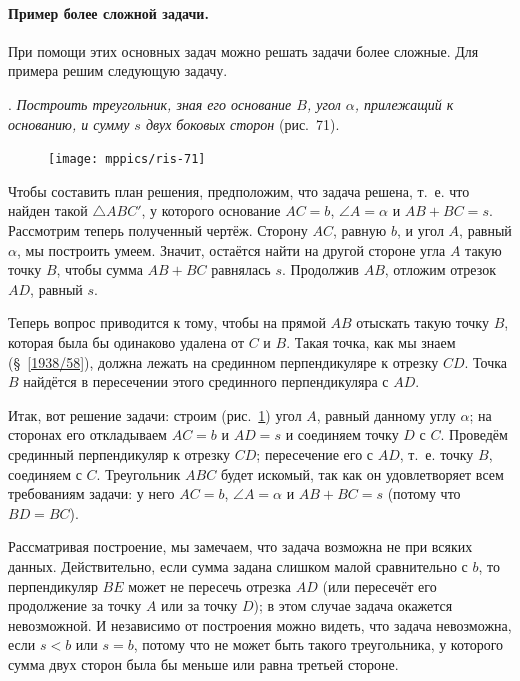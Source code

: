 \documentclass[oneside]{book}
\begin{document}
\paragraph{Пример более сложной задачи.}\label{1938/68}
При помощи этих основных задач можно решать задачи более сложные.
Для примера решим следующую задачу.

.
\emph{Построить треугольник, зная его основание $B$, угол $\alpha$, прилежащий к основанию, и сумму $s$ двух боковых сторон} (рис.~71).

\begin{figure}[h!]
\centering
\texttt{[image: mppics/ris-71]}
\caption{}\label{1938/ris-71}
\end{figure}

Чтобы составить план решения, предположим, что задача решена, т.~е. что найден такой $\triangle ABC'$, у которого основание $AC = b$, $\angle A=\alpha$ и $AB+BC=s$.
Рассмотрим теперь полученный чертёж.
Сторону $AC$, равную $b$, и угол $A$, равный $\alpha$, мы построить умеем.
Значит, остаётся найти на другой стороне угла $A$ такую точку $B$, чтобы сумма $AB+BC$ равнялась $s$.
Продолжив $AB$, отложим отрезок $AD$, равный $s$.

Теперь вопрос приводится к тому, чтобы на прямой $AB$ отыскать такую точку $B$, которая была бы одинаково удалена от $C$ и $B$.
Такая точка, как мы знаем (§~\ref{1938/58}), должна лежать на срединном перпендикуляре к отрезку $CD$. 
Точка $B$ найдётся в пересечении этого срединного перпендикуляра с $AD$. 

Итак, вот решение задачи:
строим (рис.~\ref{1938/ris-71}) угол $A$, равный данному углу $\alpha$;
на сторонах его откладываем $AC=b$ и $AD=s$ и соединяем точку $D$ с $C$.
Проведём срединный перпендикуляр к отрезку $CD$;
пересечение его с $AD$, т.~е. точку $B$, соединяем с $C$.
Треугольник $ABC$ будет  искомый, так как он удовлетворяет всем требованиям задачи:
у него $AC=b$, $\angle A = \alpha$ и $AB+BC=s$ (потому что $BD=BC$).

Рассматривая построение, мы замечаем, что задача возможна не при всяких данных.
Действительно, если сумма задана слишком малой сравнительно с $b$, то перпендикуляр $BE$ может не пересечь отрезка $AD$ (или пересечёт его продолжение за точку $A$ или за точку $D$);
в этом случае задача окажется невозможной.
И независимо от построения можно видеть, что задача невозможна, если $s<b$ или $s=b$, потому что не может быть такого треугольника, у которого сумма двух сторон была бы меньше или равна третьей стороне.
\end{document}
